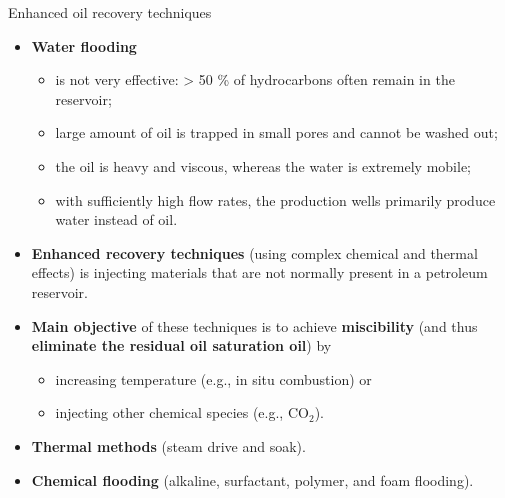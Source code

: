 \begin{frame}{Enhanced oil recovery techniques}
	\begin{itemize}
	 \item \alert{\bf Water flooding}
	\begin{itemize}
		\item is not very effective: > 50 \%  of hydrocarbons often remain in the reservoir;
		\item large amount of oil is trapped in small pores and cannot be washed out;
		\item the oil is heavy and viscous, whereas the water is extremely mobile;
		\item with sufficiently high flow rates, the production wells primarily produce water instead of oil.
	\end{itemize}
	\item \alert{\bf Enhanced recovery techniques} (using complex chemical and thermal effects) is injecting materials that are not normally present in a petroleum reservoir. 
	\item {\bf Main objective} of these techniques	is to achieve \alert{\bf miscibility} (and thus \alert{\bf eliminate the residual oil saturation oil}) by
	\begin{itemize}
		\item increasing temperature (e.g., in situ combustion) or
		\item injecting other chemical species (e.g., CO$_2$).
	\end{itemize}
	\item {\bf Thermal methods} (steam drive and soak).
	\item {\bf Chemical flooding} (alkaline, surfactant, polymer, and foam flooding).
	\end{itemize}
\end{frame}
%
%
